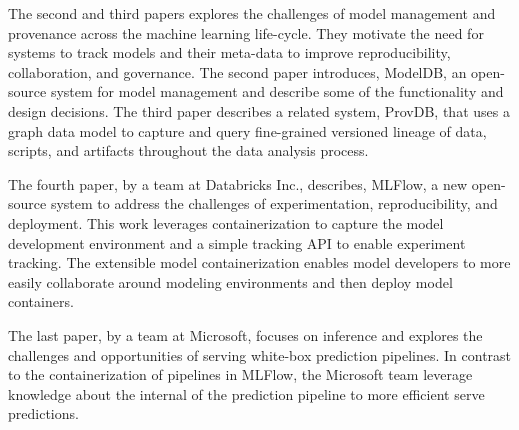 \documentclass[11pt]{article}
\begin{document}
The second and third papers explores the challenges of model management and provenance across the machine learning life-cycle.
They motivate the need for systems to track models and their meta-data to improve reproducibility, collaboration, and governance. 
The second paper introduces, ModelDB, an open-source system for model management and describe some of the functionality and design decisions. 
The third paper describes a related system, ProvDB, that uses a graph data model to capture and query fine-grained versioned lineage of data, scripts, and artifacts throughout the data analysis process.


The fourth paper, by a team at Databricks Inc., describes, MLFlow, a new open-source system to address the challenges of experimentation, reproducibility, and deployment. 
This work leverages containerization to capture the model development environment and a simple tracking API to enable experiment tracking.
The extensible model containerization enables model developers to more easily collaborate around modeling environments and then deploy model containers.


The last paper, by a team at Microsoft, focuses on inference and explores the challenges and opportunities of serving white-box prediction pipelines.  
In contrast to the containerization of pipelines in MLFlow, the Microsoft team leverage knowledge about the internal of the prediction pipeline to more efficient serve predictions. 
\end{document}
